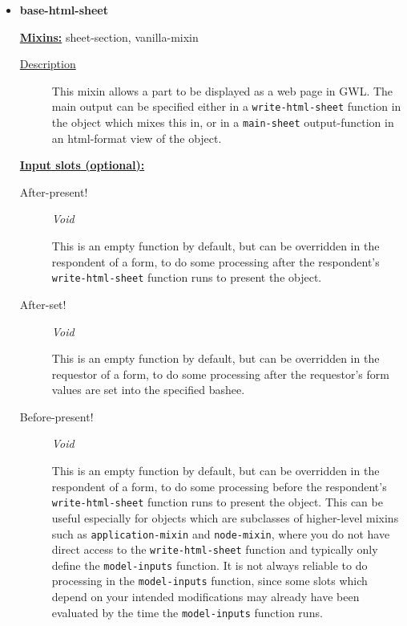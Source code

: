 \documentclass [11pt]{book}
\begin{document}
\begin{itemize}
\item {}
\label{prim:base-html-sheet}
\textbf{base-html-sheet}


\textbf{
\underline{Mixins:}} sheet-section, vanilla-mixin





\begin{description}

\item [
\underline{Description}]


This mixin allows a part to be displayed as a web page in GWL. 
The main output can be specified either in a \texttt{write-html-sheet} function in the object which
mixes  this in, or in a \texttt{main-sheet} output-function in an html-format view of the 
object.



\end{description}








\textbf{
\underline{Input slots (optional):}}

\begin{description}

\item [After-present!]
\emph{Void}

 This is an empty function by default, but can be overridden in
the respondent of a form, to do some processing after the respondent's
\texttt{write-html-sheet} function runs to present the object.




\item [After-set!]
\emph{Void}

 This is an empty function by default, but can be overridden in
the requestor of a form, to do some processing after the requestor's form
values are set into the specified bashee.




\item [Before-present!]
\emph{Void}

 This is an empty function by default, but can be overridden in
the respondent of a form, to do some processing before the respondent's
\texttt{write-html-sheet} function runs to present the object. This can be
useful especially for objects which are subclasses of higher-level mixins such as
\texttt{application-mixin} and \texttt{node-mixin}, where you do not have
direct access to the \texttt{write-html-sheet} function and typically only define
the \texttt{model-inputs} function. It is not always reliable to do processing
in the \texttt{model-inputs} function, since some slots which depend on your
intended modifications may already have been evaluated by the time the
\texttt{model-inputs} function runs.





\end{description}
\end{itemize}
\end{document}
